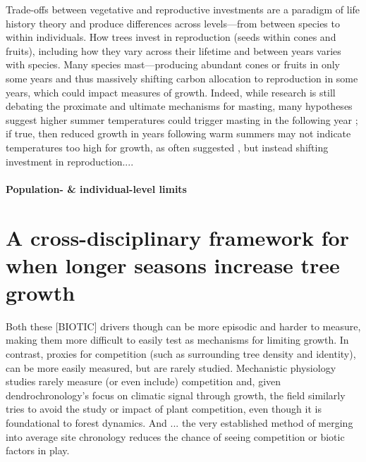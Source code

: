 \documentclass[11pt]{article}
\begin{document}
Trade-offs between vegetative and reproductive investments are a paradigm of life history theory and produce differences across levels---from between species to within individuals. How trees invest in reproduction (seeds within cones and fruits), including how they vary across their lifetime and between years varies with species. Many species mast---producing abundant cones or fruits in only some years and thus massively shifting carbon allocation to reproduction in some years, which could impact measures of growth. Indeed, while research is still debating the proximate and ultimate mechanisms for masting, many hypotheses suggest higher summer temperatures could trigger masting in the following year \citep{hacket2016tree,hacket2016consistent}; if true, then reduced growth in years following warm summers may not indicate temperatures too high for growth, as often suggested \citep[e.g.,][]{gantois2022new,dow2022warm}, but instead shifting investment in reproduction.... 

\paragraph{Population- \& individual-level limits}

\section*{A cross-disciplinary framework for when longer seasons increase tree growth}
 
 
 


Both these [BIOTIC] drivers though can be more episodic and harder to measure, making them more difficult to easily test as mechanisms for limiting growth. In contrast, proxies for competition (such as surrounding tree density and identity), can be more easily measured, but are rarely studied. Mechanistic physiology studies rarely measure (or even include) competition and, given dendrochronology's focus on climatic signal through growth, the field similarly tries to avoid the study or impact of plant competition, even though it is foundational to forest dynamics. And ...  the very established method of merging into average site chronology reduces the chance of seeing competition or biotic factors in play.
\end{document}
